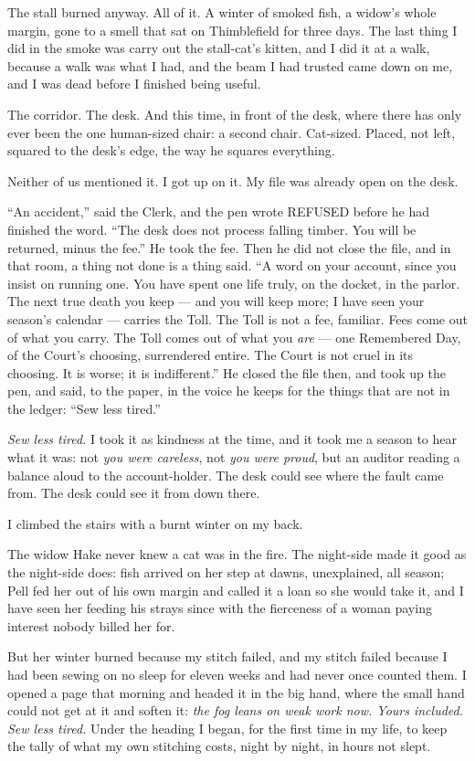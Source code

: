 The stall burned anyway. All of it. A winter of smoked fish, a widow's whole margin, gone to a smell that sat on Thimblefield for three days. The last thing I did in the smoke was carry out the stall-cat's kitten, and I did it at a walk, because a walk was what I had, and the beam I had trusted came down on me, and I was dead before I finished being useful.

The corridor. The desk. And this time, in front of the desk, where there has only ever been the one human-sized chair: a second chair. Cat-sized. Placed, not left, squared to the desk's edge, the way he squares everything.

Neither of us mentioned it. I got up on it. My file was already open on the desk.

``An accident,'' said the Clerk, and the pen wrote REFUSED before he had finished the word. ``The desk does not process falling timber. You will be returned, minus the fee.'' He took the fee. Then he did not close the file, and in that room, a thing not done is a thing said. ``A word on your account, since you insist on running one. You have spent one life truly, on the docket, in the parlor. The next true death you keep --- and you will keep more; I have seen your season's calendar --- carries the Toll. The Toll is not a fee, familiar. Fees come out of what you carry. The Toll comes out of what you \emph{are} --- one Remembered Day, of the Court's choosing, surrendered entire. The Court is not cruel in its choosing. It is worse; it is indifferent.'' He closed the file then, and took up the pen, and said, to the paper, in the voice he keeps for the things that are not in the ledger: ``Sew less tired.''

\emph{Sew less tired.} I took it as kindness at the time, and it took me a season to hear what it was: not \emph{you were careless}, not \emph{you were proud}, but an auditor reading a balance aloud to the account-holder. The desk could see where the fault came from. The desk could see it from down there.

I climbed the stairs with a burnt winter on my back.

The widow Hake never knew a cat was in the fire. The night-side made it good as the night-side does: fish arrived on her step at dawns, unexplained, all season; Pell fed her out of his own margin and called it a loan so she would take it, and I have seen her feeding his strays since with the fierceness of a woman paying interest nobody billed her for.

But her winter burned because my stitch failed, and my stitch failed because I had been sewing on no sleep for eleven weeks and had never once counted them. I opened a page that morning and headed it in the big hand, where the small hand could not get at it and soften it: \emph{the fog leans on weak work now. Yours included. Sew less tired.} Under the heading I began, for the first time in my life, to keep the tally of what my own stitching costs, night by night, in hours not slept.

